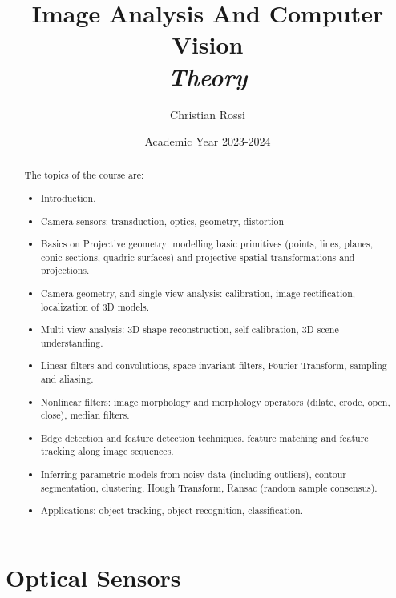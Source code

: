 \documentclass[12pt, a4paper]{report}
\title{Image Analysis And Computer Vision\\ \textit{Theory}}
\author{Christian Rossi}
\date{Academic Year 2023-2024}
\newtheorem[style=M,bodystyle=\normalfont]{theorem}{Theorem}
\newtheorem[style=M,bodystyle=\normalfont]{corollary}{Corollary}
\newtheorem[style=M,bodystyle=\normalfont]{lemma}{Lemma}
\newtheorem[style=M,bodystyle=\normalfont]{definition}{Definition}
\begin{document}
\maketitle

\newpage

\begin{abstract}
    The topics of the course are: 
    \begin{itemize}
        \item Introduction.
        \item Camera sensors: transduction, optics, geometry, distortion
        \item Basics on Projective geometry: modelling basic primitives (points, lines, planes, conic sections, quadric surfaces) and projective spatial transformations and  projections.
        \item Camera geometry, and single view analysis: calibration, image rectification, localization of 3D models.
        \item Multi-view analysis: 3D shape reconstruction, self-calibration, 3D scene understanding.
        \item Linear filters and convolutions, space-invariant filters, Fourier Transform, sampling and aliasing. 
        \item Nonlinear filters: image morphology and morphology operators (dilate, erode, open, close), median filters.
        \item Edge detection and feature detection techniques. feature matching and feature tracking along image sequences.
        \item Inferring parametric models from noisy data (including outliers), contour segmentation, clustering, Hough Transform, Ransac (random sample consensus). 
        \item Applications: object tracking, object recognition, classification.
    \end{itemize}
\end{abstract}

\newpage

\tableofcontents

\newpage

\chapter{Optical Sensors}
\end{document}
